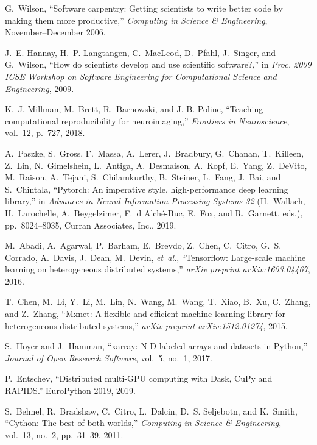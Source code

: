 \documentclass[twocolumn]{article}
\begin{document}
\begin{thebibliography}{10}
G.~Wilson, ``Software carpentry: Getting scientists to write better code by
  making them more productive,'' {\em Computing in Science \& Engineering},
  November--December 2006.

J.~E. Hannay, H.~P. Langtangen, C.~MacLeod, D.~Pfahl, J.~Singer, and G.~Wilson,
  ``How do scientists develop and use scientific software?,'' in {\em Proc.
  2009 ICSE Workshop on Software Engineering for Computational Science and
  Engineering}, 2009.

K.~J. Millman, M.~Brett, R.~Barnowski, and J.-B. Poline, ``Teaching
  computational reproducibility for neuroimaging,'' {\em Frontiers in
  Neuroscience}, vol.~12, p.~727, 2018.

A.~Paszke, S.~Gross, F.~Massa, A.~Lerer, J.~Bradbury, G.~Chanan, T.~Killeen,
  Z.~Lin, N.~Gimelshein, L.~Antiga, A.~Desmaison, A.~Kopf, E.~Yang, Z.~DeVito,
  M.~Raison, A.~Tejani, S.~Chilamkurthy, B.~Steiner, L.~Fang, J.~Bai, and
  S.~Chintala, ``Pytorch: An imperative style, high-performance deep learning
  library,'' in {\em Advances in Neural Information Processing Systems 32}
  (H.~Wallach, H.~Larochelle, A.~Beygelzimer, F.~d\textquotesingle
  Alch\'{e}-Buc, E.~Fox, and R.~Garnett, eds.), pp.~8024--8035, Curran
  Associates, Inc., 2019.

M.~Abadi, A.~Agarwal, P.~Barham, E.~Brevdo, Z.~Chen, C.~Citro, G.~S. Corrado,
  A.~Davis, J.~Dean, M.~Devin, {\em et~al.}, ``Tensorflow: Large-scale machine
  learning on heterogeneous distributed systems,'' {\em arXiv preprint
  arXiv:1603.04467}, 2016.

T.~Chen, M.~Li, Y.~Li, M.~Lin, N.~Wang, M.~Wang, T.~Xiao, B.~Xu, C.~Zhang, and
  Z.~Zhang, ``Mxnet: A flexible and efficient machine learning library for
  heterogeneous distributed systems,'' {\em arXiv preprint arXiv:1512.01274},
  2015.

S.~Hoyer and J.~Hamman, ``xarray: {N-D} labeled arrays and datasets in
  {Python},'' {\em Journal of Open Research Software}, vol.~5, no.~1, 2017.

P.~Entschev, ``{D}istributed multi-{GPU} computing with {D}ask, {C}u{P}y and
  {RAPIDS}.'' EuroPython 2019, 2019.

S.~Behnel, R.~Bradshaw, C.~Citro, L.~Dalcin, D.~S. Seljebotn, and K.~Smith,
  ``Cython: The best of both worlds,'' {\em Computing in Science \&
  Engineering}, vol.~13, no.~2, pp.~31--39, 2011.


\end{thebibliography}
\end{document}

